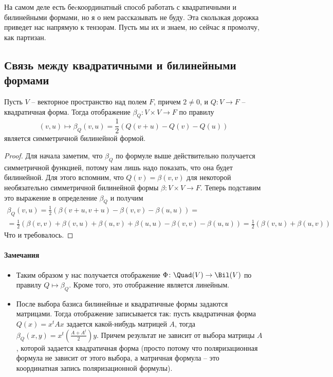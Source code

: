 На самом деле есть беcкоординатный способ работать с квадратичными и билинейными формами, но я о нем рассказывать не буду.
Эта скользкая дорожка приведет нас напрямую к тензорам.
Пусть мы их и знаем, но сейчас я промолчу, как партизан.


\subsection{Связь между квадратичными и билинейными формами}


\begin{claim}
Пусть $V$ -- векторное пространство над полем $F$, причем $2 \neq 0$, и $Q\colon V\to F$ -- квадратичная форма.
Тогда отображение $\beta_Q\colon V\times V\to F$ по правилу 
\[
(v,u)\mapsto \beta_Q(v, u) = \frac{1}{2}\left(Q(v+u) - Q(v) - Q(u)\right)
\]
является симметричной билинейной формой.
\end{claim}
\begin{proof}
Для начала заметим, что $\beta_Q$ по формуле выше действительно получается симметричной функцией, потому нам лишь надо показать, что она будет билинейной.
Для этого вспомним, что $Q(v) = \beta(v, v)$ для некоторой необязательно симметричной билинейной формы $\beta\colon V\times V\to F$.
Теперь подставим это выражение в определение $\beta_Q$ и получим
\begin{gather*}
\beta_Q(v, u) = \frac{1}{2}\left(\beta(v + u, v + u) - \beta(v, v) - \beta(u, u)\right) =\\
= \frac{1}{2}\left(\beta(v,v) + \beta(v, u) + \beta(u, v) + \beta(u,u)- \beta(v, v) - \beta(u, u)\right) = \frac{1}{2}\left(\beta(v, u) + \beta(u, v) \right)
\end{gather*}
Что и требовалось.
\end{proof}

\paragraph{Замечания}

\begin{itemize}
\item Таким образом у нас получается отображение $\Phi\colon\Quad(V) \to \Bil(V)$ по правилу $Q\mapsto \beta_Q$.
Кроме того, это отображение является линейным.

\item После выбора базиса билинейные и квадратичные формы задаются матрицами.
Тогда отображение записывается так: пусть квадратичная форма $Q(x) = x^t A x$ задается какой-нибудь матрицей $A$, тогда $\beta_Q(x, y) = x^t \left(\frac{A + A^t}{2}\right) y$.
Причем результат не зависит от выбора матрицы $A$, которой задается квадратичная форма (просто потому что поляризационная формула не зависит от этого выбора, а матричная формула -- это координатная запись поляризационной формулы).
\end{itemize}


